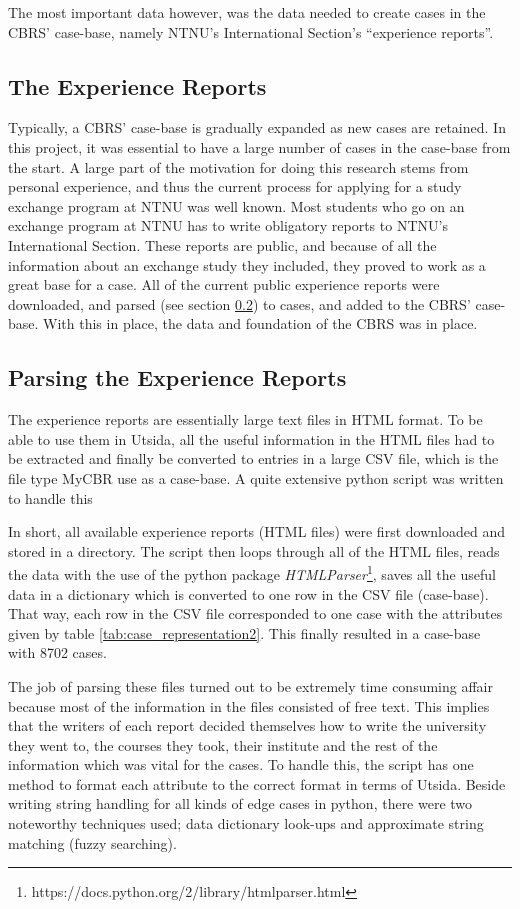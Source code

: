 The most important data however, was the data needed to create cases in the CBRS' case-base, namely NTNU's International Section's \enquote{experience reports}.

\subsection{The Experience Reports}\label{sec:experience_reports}
Typically, a CBRS' case-base is gradually expanded as new cases are retained. In this project, it was essential to have a large number of cases in the case-base from the start. A large part of the motivation for doing this research stems from personal experience, and thus the current process for applying for a study exchange program at NTNU was well known. Most students who go on an exchange program at NTNU has to write obligatory reports to NTNU's International Section. These reports are public, and because of all the information about an exchange study they included, they proved to work as a great base for a case. All of the current public experience reports were downloaded, and parsed (see section \ref{sec:parsing_experience_reports}) to cases, and added to the CBRS' case-base. With this in place, the data and foundation of the CBRS was in place.

\subsection{Parsing the Experience Reports}\label{sec:parsing_experience_reports}
The experience reports are essentially large text files in HTML format. To be able to use them in Utsida, all the useful information in the HTML files had to be extracted and finally be converted to entries in a large CSV file, which is the file type MyCBR use as a case-base. A quite extensive python script was written to handle this

In short, all available experience reports (HTML files) were first downloaded and stored in a directory. The script then loops through all of the HTML files, reads the data with the use of the python package \emph{HTMLParser}\footnote{https://docs.python.org/2/library/htmlparser.html}, saves all the useful data in a dictionary which is converted to one row in the CSV file (case-base). That way, each row in the CSV file corresponded to one case with the attributes given by table \ref{tab:case_representation2}. This finally resulted in a case-base with 8702 cases.

The job of parsing these files turned out to be extremely time consuming affair because most of the information in the files consisted of free text. This implies that the writers of each report decided themselves how to write the university they went to, the courses they took, their institute and the rest of the information which was vital for the cases. To handle this, the script has one method to format each attribute to the correct format in terms of Utsida. Beside writing string handling for all kinds of edge cases in python, there were two noteworthy techniques used; data dictionary look-ups and approximate string matching (fuzzy searching).


